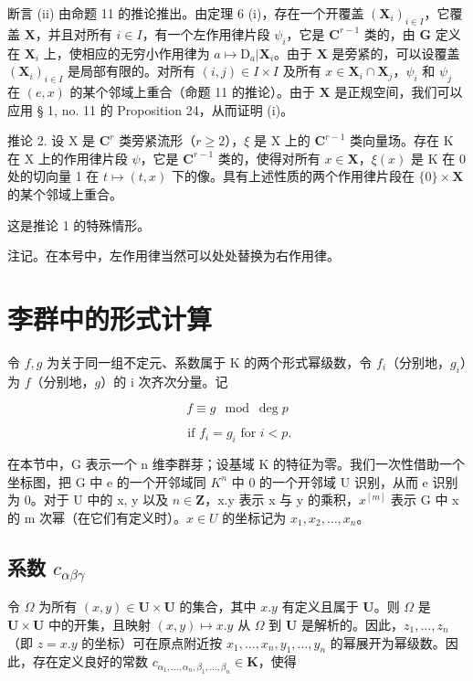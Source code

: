 断言 (ii) 由命题 11 的推论推出。由定理 6 (i)，存在一个开覆盖 \((\mathbf{X}_i)_{i\in I}\)，它覆盖 \(\mathbf{X}\)，并且对所有 \(i\in I\)，有一个左作用律片段 \(\psi_i\)，它是 \(\mathbf{C}^{r-1}\) 类的，由 \(\mathbf{G}\) 定义在 \(\mathbf{X}_i\) 上，使相应的无穷小作用律为 \(a\mapsto \mathrm{D}_a|\mathbf{X}_i\)。由于 \(\mathbf{X}\) 是旁紧的，可以设覆盖 \((\mathbf{X}_i)_{i\in I}\) 是局部有限的。对所有 \((i,j)\in I\times I\) 及所有 \(x\in \mathbf{X}_i\cap \mathbf{X}_j\)，\(\psi_i\) 和 \(\psi_j\) 在 \((e,x)\) 的某个邻域上重合（命题 11 的推论）。由于 \(\mathbf{X}\) 是正规空间，我们可以应用 § 1, no. 11 的 Proposition 24，从而证明 (i)。

推论 2. 设 X 是 \(\mathbf{C}^r\) 类旁紧流形（\(r \geqslant 2\)），\(\xi\) 是 X 上的 \(\mathbf{C}^{r-1}\) 类向量场。存在 K 在 X 上的作用律片段 \(\psi\)，它是 \(\mathbf{C}^{r-1}\) 类的，使得对所有 \(x \in \mathbf{X}\)，\(\xi(x)\) 是 K 在 0 处的切向量 1 在 \(t \mapsto (t, x)\) 下的像。具有上述性质的两个作用律片段在 \(\{0\} \times \mathbf{X}\) 的某个邻域上重合。

这是推论 1 的特殊情形。

注记。在本号中，左作用律当然可以处处替换为右作用律。

\section{李群中的形式计算}

令 \(f, g\) 为关于同一组不定元、系数属于 K 的两个形式幂级数，令 \(f_i\)（分别地，\(g_i\)）为 \(f\)（分别地，\(g\)）的 i 次齐次分量。记

\[
f \equiv g \mod \deg p
\]

\[
\text { if } f _ {i} = g _ {i} \text { for } i <   p.
\]

在本节中，G 表示一个 n 维李群芽；设基域 K 的特征为零。我们一次性借助一个坐标图，把 G 中 e 的一个开邻域同 \(K^{n}\) 中 0 的一个开邻域 U 识别，从而 e 识别为 0。对于 U 中的 x, y 以及 \(n \in \mathbf{Z}\)，x.y 表示 x 与 y 的乘积，\(x^{[m]}\) 表示 G 中 x 的 m 次幂（在它们有定义时）。\(x \in U\) 的坐标记为 \(x_{1}, x_{2}, \ldots, x_{n}\)。

\subsection{\texorpdfstring{系数 \(c_{\alpha\beta\gamma}\)}{系数 c\_\{\textbackslash alpha\textbackslash beta\textbackslash gamma\}}}

令 \(\Omega\) 为所有 \((x,y)\in\mathbf{U}\times\mathbf{U}\) 的集合，其中 \(x.y\) 有定义且属于 \(\mathbf{U}\)。则 \(\Omega\) 是 \(\mathbf{U}\times\mathbf{U}\) 中的开集，且映射 \((x,y)\mapsto x.y\) 从 \(\Omega\) 到 \(\mathbf{U}\) 是解析的。因此，\(z_{1},\ldots,z_{n}\)（即 \(z=x.y\) 的坐标）可在原点附近按 \(x_{1},\ldots,x_{n},y_{1},\ldots,y_{n}\) 的幂展开为幂级数。因此，存在定义良好的常数 \(c_{\alpha_{1},\ldots,\alpha_{n},\beta_{1},\ldots,\beta_{n}}\in\mathbf{K}\)，使得

